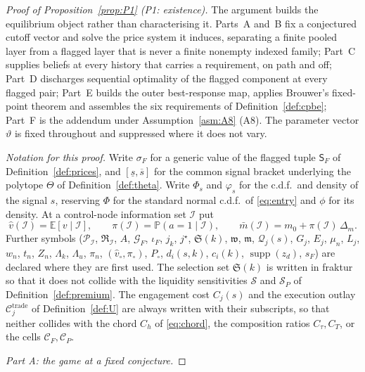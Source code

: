\documentclass[11pt]{article}
\newcommand{\Eop}{\mathbb{E}}
\newcommand{\Prb}{\mathbb{P}}
\newcommand{\Sfl}{\mathsf{S}_F}
\begin{document}
\begin{proof}[Proof of Proposition~\ref{prop:P1} (P1: existence)]
The argument builds the equilibrium object rather than characterising it. Parts~A and~B fix a
conjectured cutoff vector and solve the price system it induces, separating a finite pooled layer
from a flagged layer that is never a finite nonempty indexed family; Part~C supplies beliefs at every
history that carries a requirement, on path and off; Part~D discharges sequential optimality of the
flagged component at every flagged pair; Part~E builds the outer best-response map, applies Brouwer's
fixed-point theorem and assembles the six requirements of Definition~\ref{def:cpbe}; Part~F is the
addendum under Assumption~\ref{asm:A8} (A8). The parameter vector $\vartheta$ is fixed throughout and
suppressed where it does not vary.

\smallskip\noindent\emph{Notation for this proof.} Write $\sigma_F$ for a generic value of
the flagged tuple $\Sfl$ of Definition~\ref{def:prices}, and
$[\underline s,\overline s]$ for the common signal bracket underlying the polytope $\Theta$ of
Definition~\ref{def:theta}. Write $\Phi_s$ and $\varphi_s$ for the c.d.f.\ and density of the signal
$s$, reserving $\Phi$ for the standard normal c.d.f.\ of \eqref{eq:entry} and $\phi$ for its density.
At a control-node information set $\mathcal I$ put
\[
\hat v(\mathcal I) = \Eop[v \mid \mathcal I],
\qquad
\pi(\mathcal I) = \Prb(a = 1 \mid \mathcal I),
\qquad
\bar m(\mathcal I) = m_0 + \pi(\mathcal I)\,\Delta_m .
\]
Further symbols ($\mathcal P_{\mathcal I}$, $\mathfrak R_{\mathcal I}$, $A$, $\mathcal G_F$, $\iota_F$, $j_k$,
$j^\star$, $\mathfrak S(k)$, $\mathfrak w$, $\mathfrak m$, $\mathcal Q_j(s)$, $G_j$, $E_j$, $\mu_n$, $L_j$, $w_n$,
$t_n$, $Z_n$, $\Lambda_k$, $\Lambda_u$, $\pi_n$, $(\hat v_\circ,\pi_\circ)$, $P_\circ$,
$d_i(s,k)$, $c_i(k)$, $\operatorname{supp}(z_d)$, $s_F$) are declared where they are first used. The
selection set $\mathfrak S(k)$ is written in fraktur so that it does not collide with the liquidity
sensitivities $\mathcal S$ and $\mathcal S_P$ of Definition~\ref{def:premium}. The engagement cost
$C_j(s)$ and the execution outlay $\mathcal C_j^{\mathrm{trade}}$ of Definition~\ref{def:U} are
always written with their subscripts, so that neither collides with the chord $C_h$ of
\eqref{eq:chord}, the composition ratios $C_\tau,C_T$, or the cells $\mathcal C_F,\mathcal C_P$.

\medskip
\noindent\emph{Part A: the game at a fixed conjecture.}


\end{proof}
\end{document}
